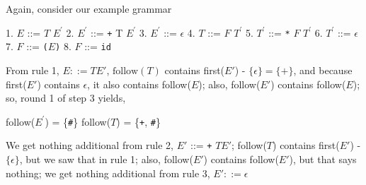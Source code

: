 \documentclass[8pt,a4paper,compress,handout]{beamer}
\newcommand{\mm}[1]{$#1$}
\newcommand{\expo}[2]{$#1^{#2}$}
\newenvironment{spaced}
{
\smallskip
\hspace{.5cm}
\begin{minipage}[c]{\textwidth}
}
{
\end{minipage}
\smallskip
}
\begin{document}
\begin{frame}[fragile]
\pause

Again, consider our example grammar

\text{ }
\begin{spaced}
\begin{production}
1. \mm{E}  ::= \mm{T} \expo{E}{\prime}
2. \expo{E}{\prime} ::= \lstinline{+} T \expo{E}{\prime}
3. \expo{E}{\prime} ::= \mm{\epsilon}
4. \mm{T}  ::= \mm{F} \expo{T}{\prime}
5. \expo{T}{\prime} ::= \lstinline{*} \mm{F} \expo{T}{\prime}
6. \expo{T}{\prime} ::= \mm{\epsilon}
7. \mm{F}  ::= \lstinline{(}\mm{E}\lstinline{)}
8. \mm{F}  ::= \lstinline{id}
\end{production}
\end{spaced}

\pause

From rule 1, $E  ::= T E'$,  $\text{follow}(T)$ contains first($E'$) - $\{\epsilon\} = \{+\}$, and because first($E'$) contains $\epsilon$, it also contains follow($E$); also, follow($E'$) contains follow($E$); so, round 1 of step 3 yields,

\text{ }
\begin{spaced}
\begin{production}
follow(\expo{E}{\prime}) = \{\lstinline{#}\}
follow(\mm{T})  = \{\lstinline{+}, \lstinline{#}\}
\end{production}
\end{spaced}

\pause

We get nothing additional from rule 2, $E'$ ::= \lstinline{+} $T E'$; follow($T$) contains first($E'$) - $\{\epsilon\}$, but we saw that in rule 1; also, follow($E'$) contains follow($E'$), but that says nothing; we get nothing additional from rule 3, $E' ::= \epsilon$
\end{frame}
\end{document}
